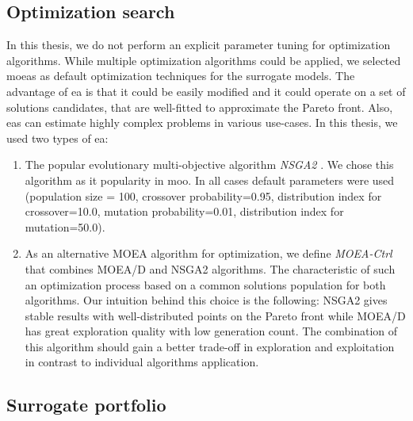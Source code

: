     \subsection{Optimization search}
    In this thesis, we do not perform an explicit parameter tuning for optimization algorithms. While multiple optimization algorithms could be applied, we selected \glspl{moea} as default optimization techniques for the surrogate models. The advantage of \gls{ea} is that it could be easily modified and it could operate on a set of solutions candidates, that are well-fitted to approximate the Pareto front. Also, \glspl{ea} can estimate highly complex problems in various use-cases. In this thesis, we used two types of \gls{ea}:

    \begin{enumerate}
        \item The popular evolutionary multi-objective algorithm \emph{NSGA2} \cite{DebAPM00}. We chose this algorithm as it popularity in \gls{moo}.  In all cases default parameters were used (population size = 100, crossover probability=0.95, distribution index for crossover=10.0, mutation probability=0.01, distribution index for mutation=50.0)\cite{francesco_biscani_2019}.
        \item As an alternative MOEA algorithm for optimization, we define \emph{MOEA-Ctrl} that combines MOEA/D \cite{ZhangL07} and NSGA2 algorithms. The characteristic of such an optimization process based on a common solutions population for both algorithms. Our intuition behind this choice is the following: NSGA2 gives stable results with well-distributed points on the Pareto front while MOEA/D has great exploration quality with low generation count. The combination of this algorithm should gain a better trade-off in exploration and exploitation in contrast to individual algorithms application.  
    \end{enumerate}

    \subsection{Surrogate portfolio}

